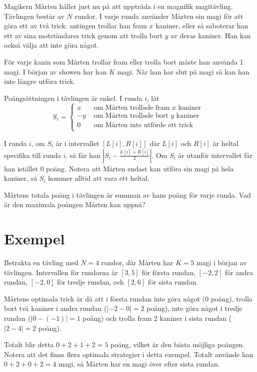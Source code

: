\newcommand\version{v2}
Magikern Mårten håller just nu på att uppträda i en magnifik magitävling.
Tävlingen består av $N$ rundor.
I varje runda använder Mårten sin magi för att göra ett av två trick: antingen trollar
han fram $x$ kaniner, eller så saboterar han ett av sina motståndares trick genom att
trolla bort $y$ av deras kaniner. Han kan också välja att inte göra något.

För varje kanin som Mårten trollar fram eller trolla bort måste han använda 1 magi.
I början av showen har han $K$ magi. När han har slut på magi så kan han inte längre
utföra trick.

Poängsättningen i tävlingen är enkel. I runda $i$, låt
\[ S_i = \begin{cases}
  x & \text{ om Mårten trollade fram $x$ kaniner } \\
  -y & \text{ om Mårten trollade bort $y$ kaniner } \\
  0 & \text{ om Mårten inte utförde ett trick } \\
\end{cases}
\]

I runda $i$, om $S_i$ är i intervallet $[L[i], R[i]]$ där $L[i]$ och $R[i]$ är heltal specifika
till runda $i$, så får han $|S_i - \frac{L[i] + R[i]}{2}|$. Om $S_i$ är utanför intervallet
får han istället $0$ poäng. Notera att Mårten endast kan utföra sin magi på hela kaniner,
så $S_i$ kommer alltid att vara ett heltal.

Mårtens totala poäng i tävlingen är summan av hans poäng för varje runda.
Vad är den maximala poängen Mårten kan uppnå?

\section*{Exempel}
Betrakta en tävling med $N = 4$ rundor, där Mårten har $K = 5$ magi i början av tävlingen.
Intervallen för rundorna är $[3, 5]$ för första rundan, $[-2, 2]$ för andra rundan, $[-2, 0]$ för tredje rundan,
och $[2, 6]$ för sista rundan.

Mårtens optimala trick är då att i första rundan inte göra något ($0$ poäng), trolla bort två kaniner i andra rundan ($|-2 - 0 | = 2$ poäng),
inte göra något i tredje rundan ($|0 - (-1)| = 1$ poäng) och trolla fram 2 kaniner i sista rundan ($|2 - 4| = 2$ poäng).

Totalt blir detta $0 + 2 + 1 + 2 = 5$ poäng, vilket är den bästa möjliga poängen. Notera att det finns flera optimala strategier i detta exempel.
Totalt använde han $0 + 2 + 0 + 2 = 4$ magi, så Mårten har en magi över efter sista rundan.

